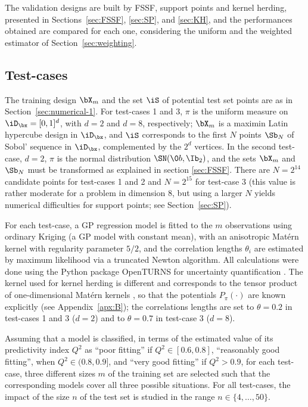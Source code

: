 The validation designs are built by FSSF, support points and kernel herding, presented in Sections~\ref{sec:FSSF}, \ref{sec:SP}, and \ref{sec:KH}, 
and the performances obtained are compared for each one, considering the uniform and the weighted estimator of Section~\ref{sec:weighting}. 

\subsection{Test-cases} \label{sec:testCases}

The training design $\bX_m$ and the set $\iS$ of potential test set points are as in Section~\ref{sec:numerical-1}. 
For test-cases 1 and 3, $\pi$ is the uniform measure on $\iD_\bx=[0,1]^d$, with $d=2$ and $d=8$, respectively; $\bX_m$ is a maximin Latin hypercube design in $\iD_\bx$, and $\iS$ corresponds to the first $N$ points $\Sb_N$ of Sobol' sequence in $\iD_\bx$, complemented by the $2^d$ vertices. 
In the second test-case, $d=2$, $\pi$ is the normal distribution $\SN(\0b,\Ib_2)$, and the sets $\bX_m$ and $\Sb_N$ must be transformed as explained in section \ref{sec:FSSF}. 
There are $N=2^{14}$ candidate points for test-cases 1 and 2 and $N=2^{15}$ for test-case 3 (this value is rather moderate for a problem in dimension 8, but using a larger $N$ yields numerical difficulties for support points; see Section~\ref{sec:SP}). 

For each test-case, a GP regression model is fitted to the $m$ observations using ordinary Kriging \citep{rasmussen_2006} (a GP model with constant mean), with an anisotropic Matérn kernel with regularity parameter $5/2$, and the correlation lengths $\theta_i$ are estimated by maximum likelihood via a truncated Newton algorithm. 
All calculations were done using the Python package OpenTURNS for uncertainty quantification \citep{baudin_dutfoy_2017}. 
The kernel used for kernel herding is different and corresponds to the tensor product of one-dimensional Matérn kernels , so that the potentials $P_{\pi}(\cdot)$ are known explicitly (see Appendix~\ref{apx:B}); the correlations lengths are set to $\theta=0.2$ in test-cases 1 and 3 ($d=2$) and to $\theta=0.7$ in test-case 3 ($d=8$).

Assuming that a model is classified, in terms of the estimated value of its predictivity index $Q^2$ as ``poor fitting'' if $Q^2\in[0.6, 0.8]$, ``reasonably good fitting'', when $Q^2\in(0.8,0.9]$, and ``very good fitting'' if $Q^2>0.9$, for each test-case, three different sizes $m$ of the training set are selected such that the corresponding models cover all three possible situations. 
For all test-cases, the impact of the size $n$ of the test set is studied in the range $n\in\{4 ,\ldots,50\}$.

